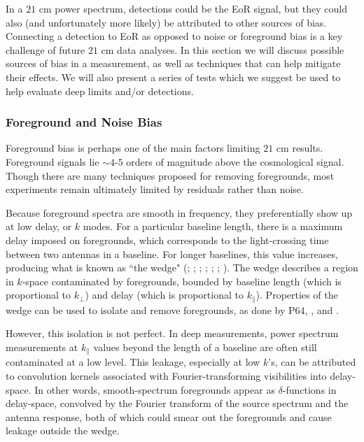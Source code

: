 \documentclass[preprint2,numberedappendix,tighten]{aastex6}  %
\begin{document}
In a $21$ cm power spectrum, detections could be the EoR signal, but they could also (and unfortunately more likely) be attributed to other sources of bias. Connecting a detection to EoR as opposed to noise or foreground bias is a key challenge of future $21$ cm data analyses. In this section we will discuss possible sources of bias in a measurement, as well as techniques that can help mitigate their effects. We will also present a series of tests which we suggest be used to help evaluate deep limits and/or detections.

\subsubsection{Foreground and Noise Bias}
\label{sec:BiasTypes}

Foreground bias is perhaps one of the main factors limiting $21$ cm results. Foreground signals lie $\sim4$-$5$ orders of magnitude above the cosmological signal. Though there are many techniques proposed for removing foregrounds, most experiments remain ultimately limited by residuals rather than noise.

Because foreground spectra are smooth in frequency, they preferentially show up at low delay, or $k$ modes. For a particular baseline length, there is a maximum delay imposed on foregrounds, which corresponds to the light-crossing time between two antennas in a baseline. For longer baselines, this value increases, producing what is known as ``the wedge" (\citealt{parsons_et_al2012b}; \citealt{liu_et_al2014a}; \citealt{liu_et_al2014b}; \citealt{vedantham_et_al2012}; \citealt{thyagarajan_et_al2013}; \citealt{pober_et_al2013}; \citealt{datta_et_al2010}). The wedge describes a region in $k$-space contaminated by foregrounds, bounded by baseline length (which is proportional to $k_{\perp}$) and delay (which is proportional to $k_{\parallel}$). Properties of the wedge can be used to isolate and remove foregrounds, as done by P64, \citet{parsons_et_al2014}, and \citet{jacobs_et_al2015}.

However, this isolation is not perfect.  In deep measurements, power spectrum measurements at $k_{\parallel}$ values beyond the length of a baseline are often still contaminated at a low level. This leakage, especially at low $k$'s, can be attributed to convolution kernels associated with Fourier-transforming visibilities into delay-space. In other words, smooth-spectrum foregrounds appear as $\delta$-functions in delay-space, convolved by the Fourier transform of the source spectrum and the antenna response, both of which could smear out the foregrounds and cause leakage outside the wedge.
\end{document}
